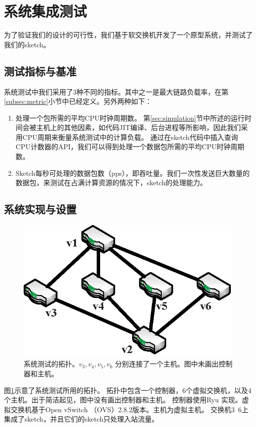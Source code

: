 \section{系统集成测试}\label{sec:proto}

为了验证我们的设计的可行性，我们基于软交换机开发了一个原型系统，并测试了我们的sketch。

\subsection{测试指标与基准}\label{sec:testbedmetric}
系统测试中我们采用了3种不同的指标。其中之一是最大链路负载率，在第\ref{subsec:metric}小节中已经定义。另外两种如下：
\begin{enumerate}
	\item
    处理一个包所需的平均CPU时钟周期数。
    第\ref{sec:simulation}节中所述的运行时间会被主机上的其他因素，如代码JIT编译、后台进程等所影响，因此我们采用CPU周期来衡量系统测试中的计算负载\cite{huang2017sketchvisor}。
    通过在sketch代码中插入查询CPU计数器的API，我们可以得到处理一个数据包所需的平均CPU时钟周期数。
	\item
    Sketch每秒可处理的数据包数（pps），即吞吐量。我们一次性发送巨大数量的数据包，来测试在占满计算资源的情况下，sketch的处理能力。
\end{enumerate}


\subsection{系统实现与设置}
\begin{figure}[h]
	\centering
	\includegraphics[width=0.68\linewidth]{fig/topo.eps}
	\caption{\textnormal{系统测试的拓扑。$v_3,v_4,v_5,v_6$ 分别连接了一个主机。图中未画出控制器和主机。}}
	\label{fig:prototypetopo}
\end{figure}

图\ref{fig:prototypetopo}示意了系统测试所用的拓扑。
拓扑中包含一个控制器，6个虚拟交换机，以及4个主机。出于简洁起见，图中没有画出控制器和主机。
控制器使用Ryu \cite{ryu}实现。虚拟交换机基于Open vSwitch （OVS）2.8.2版本\cite{openvswitch}。主机为虚拟主机。
交换机3~6上集成了sketch，并且它们的sketch只处理入站流量。

